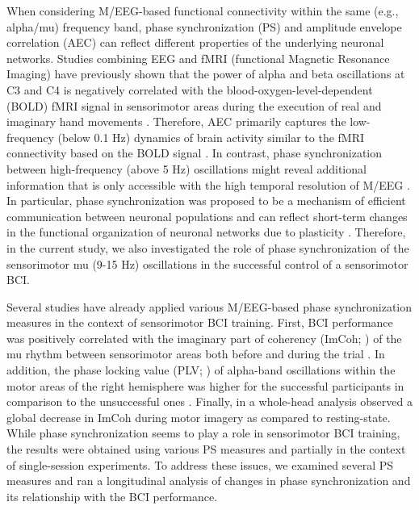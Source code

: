 When considering M/EEG-based functional connectivity within the same (e.g., alpha/mu) frequency band, phase synchronization (PS) and amplitude envelope correlation (AEC) can reflect different properties of the underlying neuronal networks. Studies combining EEG and fMRI (functional Magnetic Resonance Imaging) have previously shown that the power of alpha and beta oscillations at C3 and C4 is negatively correlated with the blood-oxygen-level-dependent (BOLD) fMRI signal in sensorimotor areas during the execution of real and imaginary hand movements \citep{Ritter2009, Yuan2010}. Therefore, AEC primarily captures the low-frequency (below 0.1 Hz) dynamics of brain activity similar to the fMRI connectivity based on the BOLD signal \citep{Engel2013}. In contrast, phase synchronization between high-frequency (above 5 Hz) oscillations might reveal additional information that is only accessible with the high temporal resolution of M/EEG \citep{Engel2013}. In particular, phase synchronization was proposed to be a mechanism of efficient communication between neuronal populations \citep{Engel2001, Fries2005, PalvaPalva2007} and can reflect short-term changes in the functional organization of neuronal networks due to plasticity \citep{Engel2013}. Therefore, in the current study, we also investigated the role of phase synchronization of the sensorimotor mu (9-15 Hz) oscillations in the successful control of a sensorimotor BCI.

\medskip

Several studies have already applied various M/EEG-based phase synchronization measures in the context of sensorimotor BCI training. First, BCI performance was positively correlated with the imaginary part of coherency (ImCoh; \cite{Nolte2004}) of the mu rhythm between sensorimotor areas both before and during the trial \citep{Sugata2014, Vidaurre2020}. In addition, the phase locking value (PLV; \cite{Lachaux1999}) of alpha-band oscillations within the motor areas of the right hemisphere was higher for the successful participants in comparison to the unsuccessful ones \citep{Leeuwis2021}. Finally, in a whole-head analysis \cite{Corsi2020} observed a global decrease in ImCoh during motor imagery as compared to resting-state. While phase synchronization seems to play a role in sensorimotor BCI training, the results were obtained using various PS measures and partially in the context of single-session experiments. To address these issues, we examined several PS measures and ran a longitudinal analysis of changes in phase synchronization and its relationship with the BCI performance.

